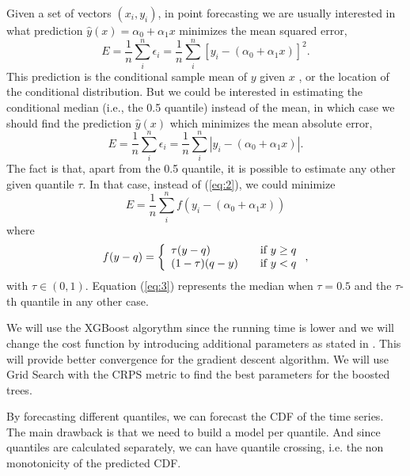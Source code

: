 \documentclass[a4paper,twocolumn,5p]{elsarticle}
\begin{document}
Given a 
set of vectors $(x_i, y_i)$, in point forecasting we are usually 
interested in what prediction $\hat y(x) = \alpha_0 + \alpha_1 x$
minimizes the mean squared error,
\begin{equation}
  \label{eq:1}
  E = \frac{1}{n} \sum^n_i \epsilon_i =
  \frac{1}{n} \sum^n_i [ y_i - (\alpha_0 + \alpha_1 x) ]^2.
\end{equation}
This prediction is the conditional sample mean of $y$ given $x$%
, or the location of the conditional distribution. But we could be
interested in estimating the conditional median (i.e., the 0.5
quantile) instead of the mean, in which case we should find the
prediction $\hat y(x)$ which minimizes the mean absolute error,
\begin{equation}
  \label{eq:2}
  E = \frac{1}{n} \sum^n_i \epsilon_i =
  \frac{1}{n} \sum^n_i | y_i - (\alpha_0 + \alpha_1 x) |.
\end{equation}
The fact is that, apart from the 0.5 quantile, it is possible to
estimate any other given quantile $\tau$. In that case, instead of
(\ref{eq:2}), we could minimize
\begin{equation}
  \label{eq:3}
E= \frac{1}{n} \sum^n_i f( y_i - (\alpha_0 + \alpha_1 x))
\end{equation}
where
\begin{equation}
  \label{eq:4}
  f(y-q) = \left\{ 
\begin{array}{l l}
\tau (y-q) & \quad \mbox{if $y \ge q$}\\
(1-\tau) (q-y) & \quad \mbox{if $y < q$}\\
\end{array} \right.,
\end{equation}
with $\tau \in (0,1)$. Equation (\ref{eq:3}) represents the
median when $\tau=0.5$ and the $\tau$-th quantile in any other case.

We will use the XGBoost algorythm \cite{xgb} since the running time is lower and we will change the cost 
function by introducing additional parameters as stated in \cite{qxgb}. This will provide better 
convergence for the gradient descent algorithm. We will use Grid Search with the CRPS metric 
to find the best parameters for the boosted trees.

By forecasting different quantiles, we
can forecast the CDF of the time series. 
The main drawback is that we need to build a model per quantile. And since quantiles 
are calculated separately, 
we can have quantile crossing, i.e. the non monotonicity of the predicted CDF. 
\end{document}
